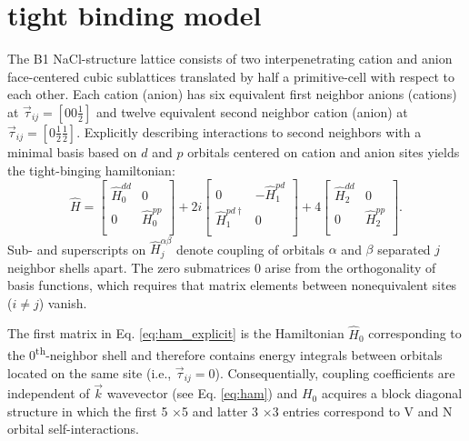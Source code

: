 \documentclass[twocolumn,showpacs,preprintnumbers,superscriptaddress,prb,floatfix,aps,10pt]{revtex4-1}
\newcommand*{\ham}{\hat{H}}
\newcommand*{\zeromat}{0}
\newcommand*{\x}{$\times$}
\begin{document}
\section{tight binding model}\label{appendix:tb}

The B1 NaCl-structure lattice consists of two interpenetrating cation and anion face-centered cubic sublattices translated by half a primitive-cell with respect to each other. Each cation (anion) has six equivalent first neighbor anions (cations) at $\vec{\tau}_{ij} = \left[0 0 \frac{1}{2}\right]$ and twelve equivalent second neighbor cation (anion) at $\vec{\tau}_{ij} = \left[0 \frac{1}{2} \frac{1}{2}\right]$. Explicitly describing interactions to second neighbors with a minimal basis based on $d$ and $p$ orbitals centered on cation and anion sites yields the tight-binging hamiltonian: 
\begin{equation}
\label{eq:ham_explicit}
\hat{H} = 
\begin{bmatrix}
\hat{H}_0^{dd} & \zeromat \\
\zeromat & \hat{H}_0^{pp} \\
\end{bmatrix}
 + 2i
\begin{bmatrix}
\zeromat              & -\hat{H}_1^{pd} \\
\hat{H}_1^{pd\dagger} &  \zeromat        \\
\end{bmatrix}
 + 4
\begin{bmatrix}
\hat{H}_2^{dd} & \zeromat       \\
\zeromat       & \hat{H}_2^{pp} \\
\end{bmatrix}.
\end{equation}
Sub- and superscripts on $\ham_{j}^{\alpha\beta}$ denote coupling of orbitals $\alpha$ and $\beta$ separated $j$ neighbor shells apart. The zero submatrices $\zeromat$ arise from the orthogonality of basis functions, which requires that matrix elements between nonequivalent sites ($i \neq j$) vanish.

The first matrix in Eq. \ref{eq:ham_explicit} is the Hamiltonian $\ham_0$ corresponding to the $0$\textsuperscript{th}-neighbor shell and therefore contains energy integrals between orbitals located on the same site (i.e., $\vec{\tau}_{ij} = 0$). Consequentially, coupling coefficients are independent of $\vec{k}$ wavevector (see Eq. \ref{eq:ham}) and $H_0$ acquires a block diagonal structure in which the first 5 \x 5 and latter 3 \x 3 entries correspond to V and N orbital self-interactions.
\end{document}
